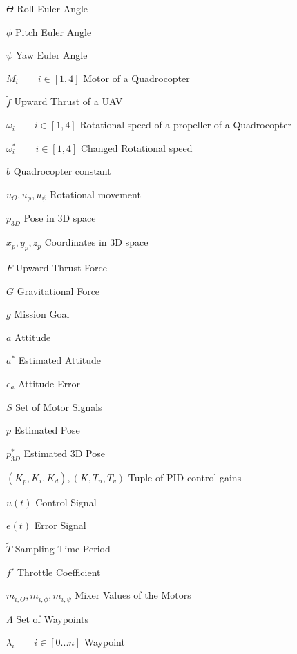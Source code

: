 \documentclass[bachelor,english]{infothesis}
\begin{document}
\begin{description}
	\item $\Theta$ \dotfill Roll Euler Angle
	\item $\phi$  \dotfill Pitch Euler Angle
	\item $\psi$ \dotfill Yaw Euler Angle
	\item $M_i \qquad i \in [1,4]$ \dotfill Motor of a Quadrocopter
	\item $\tilde{f}$ \dotfill Upward Thrust of a UAV
	\item $\omega_i \qquad i \in [1,4]$ \dotfill  Rotational speed of a propeller of a Quadrocopter
	\item $\omega_i^* \qquad i \in [1,4]$ \dotfill Changed Rotational speed 
	\item $b$ \dotfill Quadrocopter constant
	\item $u_{\Theta}, u_{\phi}, u_{\psi}$ \dotfill Rotational movement
	\item $p_{3D}$ \dotfill Pose in 3D space
	\item $x_p, y_p, z_p$ \dotfill Coordinates in 3D space
	\item $F$ \dotfill Upward Thrust Force
	\item $G$ \dotfill Gravitational Force
	\\
	\item $g$ \dotfill Mission Goal
	\item $a$ \dotfill Attitude
	\item $a^*$ \dotfill Estimated Attitude
	\item $e_a$ \dotfill Attitude Error
	\item $S$ \dotfill Set of Motor Signals
	\item $p$ \dotfill Estimated Pose
	\item $p_{3D}^*$ \dotfill Estimated 3D Pose
	\item $(K_p, K_i, K_d), (K, T_n, T_v)$  \dotfill Tuple of PID control gains
	\item $u(t)$ \dotfill Control Signal
	\item $e(t)$ \dotfill Error Signal
	\item $\tilde{T}$ \dotfill Sampling Time Period
	\item $f'$ \dotfill Throttle Coefficient
	\item $m_{i,\Theta} , m_{i, \phi}, m_{i, \psi}$ \dotfill Mixer Values of the Motors
	\item $\Lambda$ \dotfill Set of Waypoints
	\item $\lambda_i \qquad i \in [0...n]$ \dotfill Waypoint

\end{description}
\end{document}
